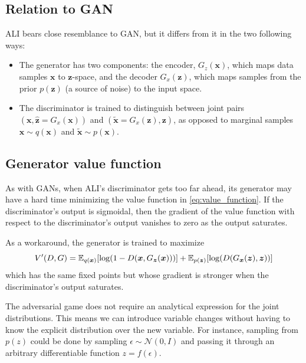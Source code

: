 \documentclass{article}
\begin{document}
\subsection{Relation to GAN}
ALI bears close resemblance to GAN, but it differs from it in the two following
ways:

\begin{itemize}
	\item The generator has two components: the encoder, $G_z(\bm{x})$, which
		maps data samples $\bm{x}$ to $\bm{z}$-space, and the decoder
		$G_x(\bm{z})$, which maps samples from the prior $p(\bm{z})$ (a source
		of noise) to the input space.
	\item The discriminator is trained to distinguish between joint pairs
		$(\bm{x}, \hat{\bm{z}} = G_x(\bm{x}))$ and $(\tilde{\bm{x}} =
		G_x(\bm{z}), \bm{z})$, as opposed to marginal samples $\bm{x} \sim
		q(\bm{x})$ and $\tilde{\bm{x}} \sim p(\bm{x})$.
\end{itemize}

\subsection{Generator value function}

As with GANs, when ALI's discriminator gets too far ahead, its generator may
have a hard time minimizing the value function in \autoref{eq:value_function}.
If the discriminator's output is sigmoidal, then the gradient of the value
function with respect to the discriminator's output vanishes to zero as the
output saturates.

As a workaround, the generator is trained to maximize
\begin{equation}
\label{eq:generator_value_function}
    V'(D, G) = \mathbb{E}_{q(\bm{x})}[\log(1 - D(\bm{x}, G_{\bm{z}}(\bm{x})))] +
               \mathbb{E}_{p(\bm{z})}[\log(D(G_{\bm{x}}(\bm{z}), \bm{z}))] \\
\end{equation}
which has the same fixed points but whose gradient is stronger when the
discriminator's output saturates.

The adversarial game does not require an analytical expression for the joint
distributions. This means we can introduce variable changes without having to
know the explicit distribution over the new variable.  For instance, sampling
from $p(z)$ could be done by sampling $\epsilon \sim \mathcal{N}(0, I)$ and
passing it through an arbitrary differentiable function $z = f(\epsilon)$.
\end{document}
